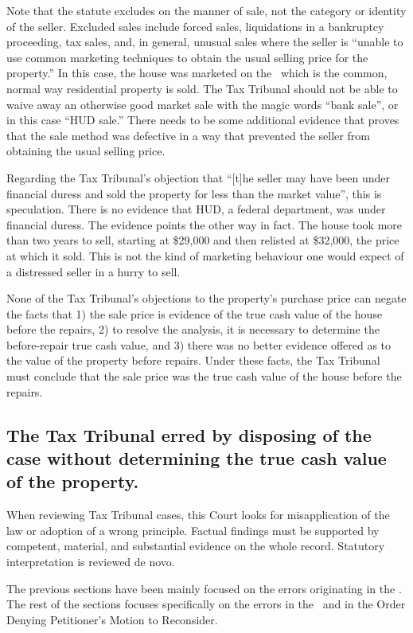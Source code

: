 \documentclass[12pt,\documentclassflag]{michiganCourtOfAppealsBrief}
\def\mathieuGast{\pincite[l]{MCL}{211.27(2)}}
\begin{document}
{Note that the statute excludes on the manner of sale, not the category or identity of the seller. Excluded sales include forced sales, liquidations in a bankruptcy proceeding, tax sales, and, in general, unusual sales where the seller is ``unable to use common marketing techniques to obtain the usual selling price for the property.'' In this case, the house was marketed on the \MLS\ which is the common, normal way residential property is sold. The Tax Tribunal should not be able to waive away an otherwise good market sale with the magic words ``bank sale'', or in this case ``HUD sale.'' There needs to be some additional evidence that proves that the sale method was defective in a way that prevented the seller from obtaining the usual selling price.

Regarding the Tax Tribunal's objection that ``[t]he seller may have been under financial duress and sold the property for less than the market value'', this is speculation. There is no evidence that HUD, a federal department, was under financial duress. The evidence points the other way in fact. The house took more than two years to sell, starting at \$29,000 and then relisted at \$32,000, the price at which it sold. This is not the kind of marketing behaviour one would expect of a distressed seller in a hurry to sell.

None of the Tax Tribunal's objections to the property's purchase price can negate the facts that 1) the sale price is evidence of the true cash value of the house before the repairs, 2) to resolve the \mathieuGast analysis, it is necessary to determine the before-repair true cash value, and 3) there was no better evidence offered as to the value of the property before repairs. Under these facts, the Tax Tribunal must conclude that the sale price was the true cash value of the house before the repairs.

\subsection{The Tax Tribunal erred by disposing of the case without determining the true cash value of the property.}

When reviewing Tax Tribunal cases, this Court looks for misapplication of the law or adoption of a wrong principle. Factual findings must be supported by competent, material, and substantial evidence on the whole record. Statutory interpretation is reviewed de novo. 

The previous sections have been mainly focused on the errors originating in the \POJ. The rest of the sections focuses specifically on the errors in the \FOJ\ and in the Order Denying Petitioner's Motion to Reconsider.

}
\end{document}
